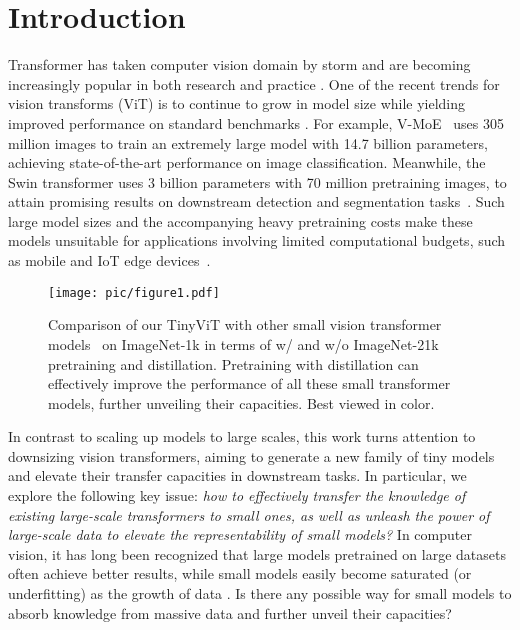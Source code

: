 \documentclass[runningheads]{llncs}
\begin{document}
\section{Introduction}

Transformer \cite{vaswani2017attention} has taken computer vision domain by storm and are becoming increasingly popular in both research and practice \cite{ViT,detr,scalevit}. One of the recent trends for vision transforms (ViT) is to continue to grow in model size while yielding improved performance on standard benchmarks \cite{scalevit,swin_v2,vmoe}. For example, V-MoE~\cite{vmoe} uses 305 million images to train an extremely large model with 14.7 billion parameters, achieving state-of-the-art performance on image classification. Meanwhile, the Swin transformer uses 3 billion parameters with 70 million pretraining images, to attain promising results on downstream detection and segmentation tasks~\cite{swin,swin_v2}. 
Such large model sizes and the accompanying heavy pretraining costs  make these models unsuitable for applications involving limited computational budgets, such as mobile and IoT edge devices~\cite{MiniViT}.

\begin{figure}[t]

	\centering
	\begin{minipage}[c]{.4\textwidth}
		\begin{flushleft}
			\caption{\footnotesize Comparison of our TinyViT with other small vision transformer models~\cite{deit,swin} on ImageNet-1k in terms of w/ and w/o ImageNet-21k pretraining and distillation. Pretraining with distillation can effectively improve the performance of all these small transformer models, further unveiling their capacities. Best viewed in color. }\label{fig:motivation}
		\end{flushleft}
	\end{minipage}\begin{minipage}[c]{.6\textwidth}
		\centering
		\begin{flushright}
			\texttt{[image: pic/figure1.pdf]}
		\end{flushright}
	\end{minipage}
	
	\vspace{-6mm}
\end{figure}

In contrast to scaling up models to large scales, this work turns attention to downsizing vision transformers, aiming to generate a new family of tiny models and elevate their transfer capacities in downstream tasks. In particular, we explore the following key issue: \textit{how to effectively transfer the knowledge of existing large-scale transformers to small ones, as well as unleash the power of large-scale data to elevate the representability of small models?} In computer vision, it has long been recognized that large models pretrained on large datasets often achieve better results, while small models easily become saturated (or underfitting) as the growth of data \cite{scalevit,swin_v2}.  
Is there any possible way for small models to absorb knowledge from massive data and further unveil their capacities?
\end{document}
